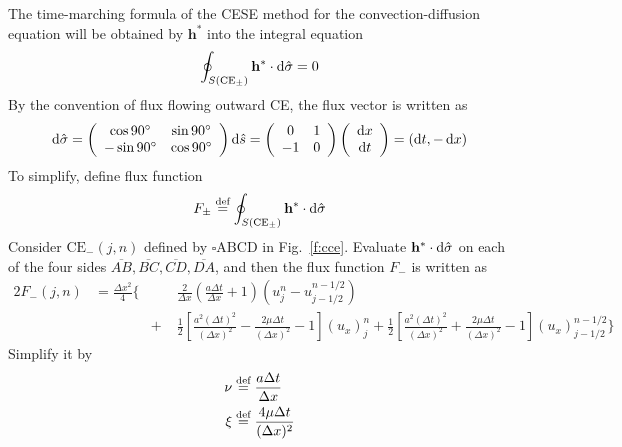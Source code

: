 \documentclass{turgon}
\begin{document}
The time-marching formula of the CESE method for the convection-diffusion
equation will be obtained by $\mathbf{h}^*$ into the integral equation
\begin{align*}
  \oint_{S(\mathrm{CE}_{\pm})}\mathbf{h}^*\cdot \mathop{}\!\mathrm{d}\hat{\sigma}=0
\end{align*}
By the convention of flux flowing outward CE, the flux vector is written as
\begin{align*}
  \mathop{}\!\mathrm{d}\hat{\sigma}
  = \left(\begin{array}{cc} \cos90^{\circ} & \sin90^{\circ} \\
                           -\sin90^{\circ} & \cos90^{\circ}
    \end{array}\right) \mathop{}\!\mathrm{d}\hat{s}
  = \left(\begin{array}{cc} 0 & 1 \\
                           -1 & 0
    \end{array}\right)
    \left(\begin{array}{c} \mathop{}\!\mathrm{d} x \\ \mathop{}\!\mathrm{d} t
    \end{array}\right)
  = (\mathop{}\!\mathrm{d} t, -\mathop{}\!\mathrm{d} x)
\end{align*}
To simplify, define flux function
\begin{align*}
  F_{\pm} \defeq
    \oint_{S(\mathrm{CE}_{\pm})}\mathbf{h}^*\cdot \dif\hat{\sigma}
\end{align*}
Consider $\mathrm{CE}_-(j,n)$ defined by $\square\mathrm{ABCD}$ in
Fig.~\ref{f:cce}.  Evaluate $\mathbf{h}^*\cdot \mathop{}\!\mathrm{d}\hat{\sigma}$ on each of the
four sides $\overline{AB}, \overline{BC}, \overline{CD}, \overline{DA}$,
and then the flux function $F_-$ is written as
\begin{alignat*}{2}
  F_-(j,n) &= \frac{\Delta x^2}{4}\Big\{
    &&\frac{2}{\Delta x}\left(\frac{a\Delta t}{\Delta x}+1\right)
      \left(u_j^n-u_{j-1/2}^{n-1/2}\right) \\
  & &+\;& \frac{1}{2}\left[
          \frac{a^2(\Delta t)^2}{(\Delta x)^2}
        - \frac{2\mu\Delta t} {(\Delta x)^2} - 1
        \right](u_x)_j^n
    +     \frac{1}{2}\left[
          \frac{a^2(\Delta t)^2}{(\Delta x)^2}
        + \frac{2\mu\Delta t} {(\Delta x)^2} - 1
        \right](u_x)_{j-1/2}^{n-1/2}
    \Big\}
\end{alignat*}
Simplify it by
\begin{align}
  \nu &\defeq \frac{a\Delta t}{\Delta x} \label{e:nu} \\
  \xi &\defeq \frac{4\mu\Delta t}{(\Delta x)^2} \label{e:xi}
\end{align}
\end{document}

